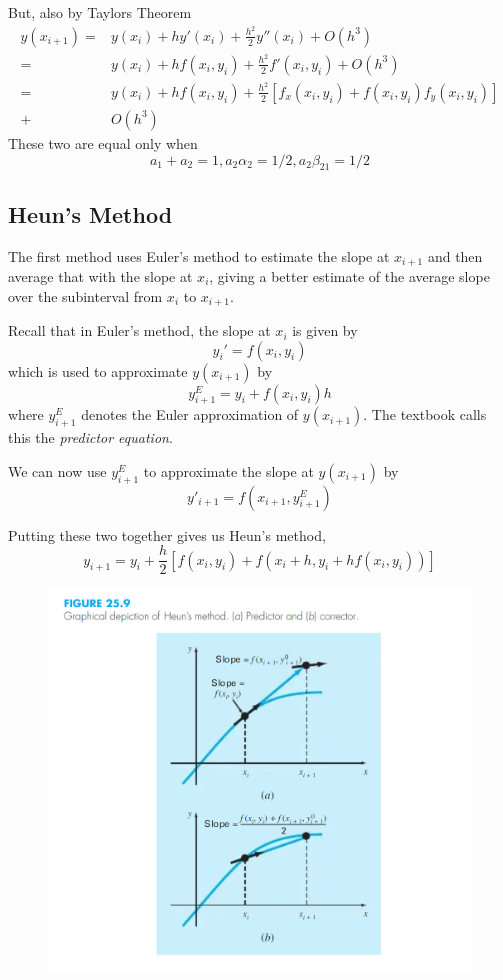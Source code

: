 \documentclass [titlepage,12pt,letter] {article}
\begin{document}
But, also by Taylors Theorem 
\begin{align*} 
y(x_{i+1}) =& y(x_i) + h y'(x_i) + \frac{h^2}{2} y''(x_i) + O(h^3) \\
	=& y(x_i) + hf(x_i,y_i) + \frac{h^2}{2} f'(x_i,y_i) + O(h^3) \\
           =& y(x_i) + h f(x_i, y_i) + \frac{h^2}{2}[f_x(x_i,y_i) + f(x_i,y_i) f_y(x_i,y_i)] \\ 
	+& O(h^3) 
\end{align*} 
These two are equal only when \[a_1+a_2=1, a_2 \alpha_2=1/2,a_2 \beta_{21}=1/2\]


\subsection{Heun's Method} 

The first method uses Euler's method to estimate the slope at $x_{i+1}$ and then average that with the slope at $x_i$, giving a better estimate of the average slope over the subinterval from $x_i$ to $x_{i+1}$. 

Recall that in Euler's method, the slope at $x_i$ is given by
\[
y_i'=f(x_i,y_i)
\]
which is used to approximate $y(x_{i+1})$ by
\[
y^E_{i+1}=y_i+f(x_i,y_i)h
\]
where $y^E_{i+1}$ denotes the Euler approximation of $y(x_{i+1})$. The textbook calls this the {\it predictor equation}.

We can now use $y^E_{i+1}$  to approximate the slope at $y(x_{i+1})$ by
\[
y'_{i+1}=f(x_{i+1},y^E_{i+1})
\]

Putting these two together gives us Heun's method,
\[
y_{i+1}=y_i+\frac{h}{2}\left[f(x_i,y_i)+f(x_i+h,y_i+hf(x_i,y_i))\right]
\]

\begin{figure}[h] 
  \centering
  \includegraphics[scale=0.8]{figure25-9}
  \label{fig:Heun}
\end{figure}
\end{document}
